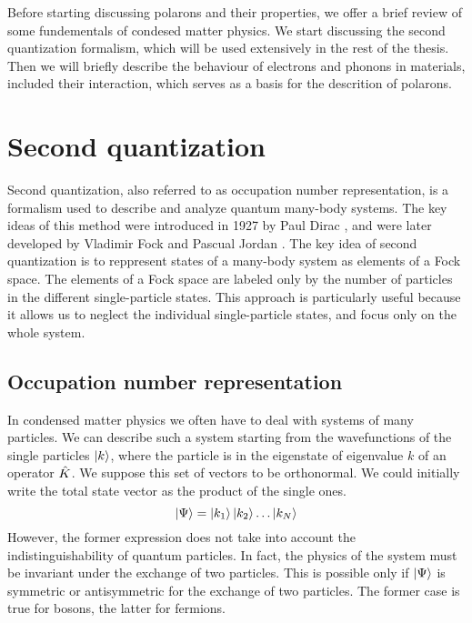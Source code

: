 Before starting discussing polarons and their properties, we offer a brief review of some fundementals of condesed matter physics. We start discussing the second quantization formalism, which will be used extensively in the rest of the thesis. Then we will briefly describe the behaviour of electrons and phonons in materials, included their interaction, which serves as a basis for the descrition of polarons.

\section{Second quantization} \label{sec:second_quantization}
Second quantization, also referred to as occupation number representation, is a formalism used to describe and analyze quantum many-body systems. The key ideas of this method were introduced in 1927 by Paul Dirac \cite{dirac1927}, and were later developed by Vladimir Fock and Pascual Jordan \cite{fock1932}. The key idea of second quantization is to reppresent states of a many-body system as elements of a Fock space. The elements of a Fock space are labeled only by the number of particles in the different single-particle states. This approach is particularly useful because it allows us to neglect the individual single-particle states, and focus only on the whole system.

\subsection{Occupation number representation}
In condensed matter physics we often have to deal with systems of many particles. We can describe such a system starting from the wavefunctions of the single particles $\ket{k}$, where the particle is in the eigenstate of eigenvalue $k$ of an operator $\hat{K}$. We suppose this set of vectors to be orthonormal. We could initially write the total state vector as the product of the single ones.
\begin{equation} \label{eq:simple_base}
    \ket{\Psi} = \ket{k_1}\ket{k_2}\dots\ket{k_N}
\end{equation}
However, the former expression does not take into account the indistinguishability of quantum particles. In fact, the physics of the system must be invariant under the exchange of two particles. This is possible only if $\ket{\Psi}$ is symmetric or antisymmetric for the exchange of two particles. The former case is true for bosons, the latter for fermions. %

